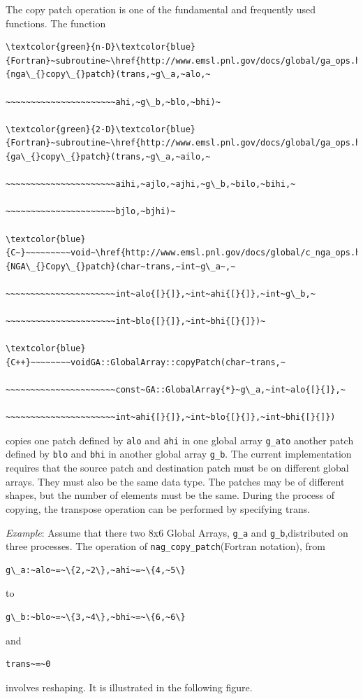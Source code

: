 The copy patch operation is one of the fundamental and frequently
used functions. The function
\begin{verbatim}
\textcolor{green}{n-D}\textcolor{blue}{Fortran}~subroutine~\href{http://www.emsl.pnl.gov/docs/global/ga_ops.html\#ga_copy_patch}{nga\_{}copy\_{}patch}(trans,~g\_a,~alo,~

~~~~~~~~~~~~~~~~~~~~~~ahi,~g\_b,~blo,~bhi)~

\textcolor{green}{2-D}\textcolor{blue}{Fortran}~subroutine~\href{http://www.emsl.pnl.gov/docs/global/ga_ops.html\#ga_copy_patch}{ga\_{}copy\_{}patch}(trans,~g\_a,~ailo,~

~~~~~~~~~~~~~~~~~~~~~~aihi,~ajlo,~ajhi,~g\_b,~bilo,~bihi,~

~~~~~~~~~~~~~~~~~~~~~~bjlo,~bjhi)~

\textcolor{blue}{C~}~~~~~~~~~void~\href{http://www.emsl.pnl.gov/docs/global/c_nga_ops.html\#ga_copy_patch}{NGA\_{}Copy\_{}patch}(char~trans,~int~g\_a~,~

~~~~~~~~~~~~~~~~~~~~~~int~alo{[}{]},~int~ahi{[}{]},~int~g\_b,~

~~~~~~~~~~~~~~~~~~~~~~int~blo{[}{]},~int~bhi{[}{]})~

\textcolor{blue}{C++}~~~~~~~~voidGA::GlobalArray::copyPatch(char~trans,~

~~~~~~~~~~~~~~~~~~~~~~const~GA::GlobalArray{*}~g\_a,~int~alo{[}{]},~

~~~~~~~~~~~~~~~~~~~~~~int~ahi{[}{]},~int~blo{[}{]},~int~bhi{[}{]})
\end{verbatim}
copies one patch defined by \texttt{alo} and \texttt{ahi} in one global
array \texttt{g\_ato} another patch defined by \texttt{blo} and \texttt{bhi}
in another global array \texttt{g\_b}. The current implementation
requires that the source patch and destination patch must be on different
global arrays. They must also be the same data type. The patches may
be of different shapes, but the number of elements must be the same.
During the process of copying, the transpose operation can be performed
by specifying trans.

\emph{Example}: Assume that there two 8x6 Global Arrays, \texttt{g\_a}
and \texttt{g\_b},distributed on three processes. The operation of
\texttt{nag\_copy\_patch}(Fortran notation), from
\begin{verbatim}
g\_a:~alo~=~\{2,~2\},~ahi~=~\{4,~5\}
\end{verbatim}
to
\begin{verbatim}
g\_b:~blo~=~\{3,~4\},~bhi~=~\{6,~6\}
\end{verbatim}
and
\begin{verbatim}
trans~=~0
\end{verbatim}
involves reshaping. It is illustrated in the following figure. 

